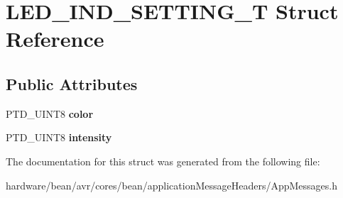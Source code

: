 \hypertarget{struct_l_e_d___i_n_d___s_e_t_t_i_n_g___t}{}\section{L\+E\+D\+\_\+\+I\+N\+D\+\_\+\+S\+E\+T\+T\+I\+N\+G\+\_\+\+T Struct Reference}
\label{struct_l_e_d___i_n_d___s_e_t_t_i_n_g___t}
\subsection*{Public Attributes}
\begin{DoxyCompactItemize}
\item 
\hypertarget{struct_l_e_d___i_n_d___s_e_t_t_i_n_g___t_ac9fb345e99435dc6c3b82565a315659e}{}P\+T\+D\+\_\+\+U\+I\+N\+T8 {\bfseries color}\label{struct_l_e_d___i_n_d___s_e_t_t_i_n_g___t_ac9fb345e99435dc6c3b82565a315659e}

\item 
\hypertarget{struct_l_e_d___i_n_d___s_e_t_t_i_n_g___t_a8565652133d7ee8d97ea1f3240d78875}{}P\+T\+D\+\_\+\+U\+I\+N\+T8 {\bfseries intensity}\label{struct_l_e_d___i_n_d___s_e_t_t_i_n_g___t_a8565652133d7ee8d97ea1f3240d78875}

\end{DoxyCompactItemize}


The documentation for this struct was generated from the following file\+:\begin{DoxyCompactItemize}
\item 
hardware/bean/avr/cores/bean/application\+Message\+Headers/App\+Messages.\+h\end{DoxyCompactItemize}
